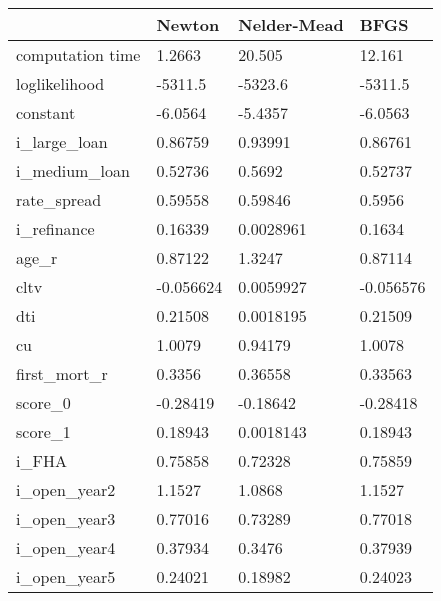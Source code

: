 \begin{tabular}{llll}
\hline 
  & Newton & Nelder-Mead & BFGS \\ 
\hline 
computation time & 1.2663 & 20.505 & 12.161 \\ 
loglikelihood & -5311.5 & -5323.6 & -5311.5 \\ 
constant & -6.0564 & -5.4357 & -6.0563 \\ 
i\_large\_loan & 0.86759 & 0.93991 & 0.86761 \\ 
i\_medium\_loan & 0.52736 & 0.5692 & 0.52737 \\ 
rate\_spread & 0.59558 & 0.59846 & 0.5956 \\ 
i\_refinance & 0.16339 & 0.0028961 & 0.1634 \\ 
age\_r & 0.87122 & 1.3247 & 0.87114 \\ 
cltv & -0.056624 & 0.0059927 & -0.056576 \\ 
dti & 0.21508 & 0.0018195 & 0.21509 \\ 
cu & 1.0079 & 0.94179 & 1.0078 \\ 
first\_mort\_r & 0.3356 & 0.36558 & 0.33563 \\ 
score\_0 & -0.28419 & -0.18642 & -0.28418 \\ 
score\_1 & 0.18943 & 0.0018143 & 0.18943 \\ 
i\_FHA & 0.75858 & 0.72328 & 0.75859 \\ 
i\_open\_year2 & 1.1527 & 1.0868 & 1.1527 \\ 
i\_open\_year3 & 0.77016 & 0.73289 & 0.77018 \\ 
i\_open\_year4 & 0.37934 & 0.3476 & 0.37939 \\ 
i\_open\_year5 & 0.24021 & 0.18982 & 0.24023 \\ 
\hline 
\end{tabular}